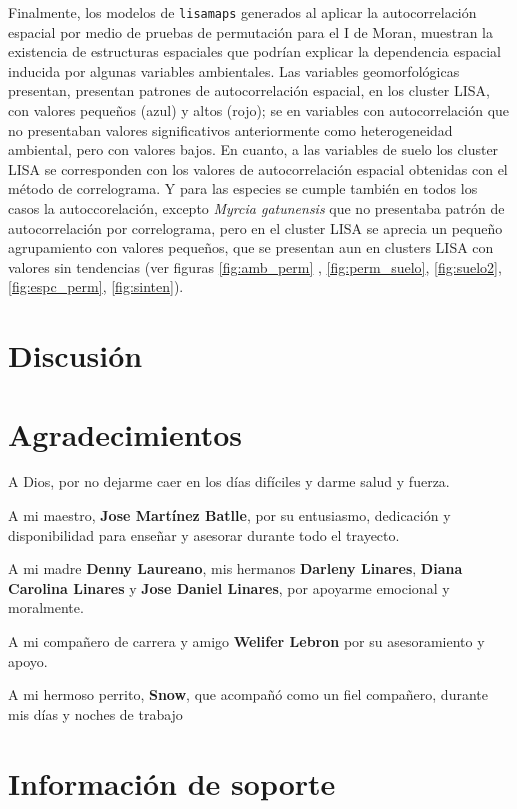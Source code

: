 \documentclass[11pt,]{article}
\begin{document}
Finalmente, los modelos de \texttt{lisamaps} generados al aplicar la
autocorrelación espacial por medio de pruebas de permutación para el I
de Moran, muestran la existencia de estructuras espaciales que podrían
explicar la dependencia espacial inducida por algunas variables
ambientales. Las variables geomorfológicas presentan, presentan patrones
de autocorrelación espacial, en los cluster LISA, con valores pequeños
(azul) y altos (rojo); se en variables con autocorrelación que no
presentaban valores significativos anteriormente como heterogeneidad
ambiental, pero con valores bajos. En cuanto, a las variables de suelo
los cluster LISA se corresponden con los valores de autocorrelación
espacial obtenidas con el método de correlograma. Y para las especies se
cumple también en todos los casos la autoccorelación, excepto
\emph{Myrcia gatunensis} que no presentaba patrón de autocorrelación por
correlograma, pero en el cluster LISA se aprecia un pequeño agrupamiento
con valores pequeños, que se presentan aun en clusters LISA con valores
sin tendencias (ver figuras \ref{fig:amb_perm} , \ref{fig:perm_suelo},
\ref{fig:suelo2}, \ref{fig:espc_perm}, \ref{fig:sinten}).

\section{Discusión}\label{discusiuxf3n}

\section{Agradecimientos}\label{agradecimientos}

A Dios, por no dejarme caer en los días difíciles y darme salud y
fuerza.

A mi maestro, \textbf{Jose Martínez Batlle}, por su entusiasmo,
dedicación y disponibilidad para enseñar y asesorar durante todo el
trayecto.

A mi madre \textbf{Denny Laureano}, mis hermanos \textbf{Darleny
Linares}, \textbf{Diana Carolina Linares} y \textbf{Jose Daniel
Linares}, por apoyarme emocional y moralmente.

A mi compañero de carrera y amigo \textbf{Welifer Lebron} por su
asesoramiento y apoyo.

A mi hermoso perrito, \textbf{Snow}, que acompañó como un fiel
compañero, durante mis días y noches de trabajo

\section{Información de soporte}\label{informaciuxf3n-de-soporte}
\end{document}
